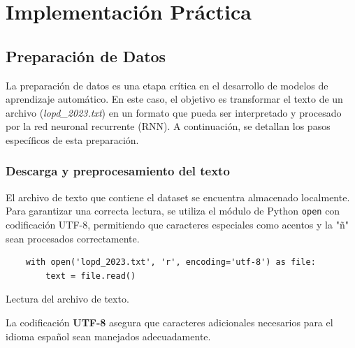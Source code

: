 \documentclass{article}
\begin{document}
\newpage

\section{Implementación Práctica}
\subsection{Preparación de Datos}
La preparación de datos es una etapa crítica en el desarrollo de modelos de aprendizaje automático. En este caso, el objetivo es transformar el texto de un archivo (\textit{lopd\_2023.txt}) en un formato que pueda ser interpretado y procesado por la red neuronal recurrente (RNN). A continuación, se detallan los pasos específicos de esta preparación.

\subsubsection{Descarga y preprocesamiento del texto}
El archivo de texto que contiene el dataset se encuentra almacenado localmente. Para garantizar una correcta lectura, se utiliza el módulo de Python \texttt{open} con codificación UTF-8, permitiendo que caracteres especiales como acentos y la "ñ" sean procesados correctamente.

\begin{listing}[H]
\begin{verbatim}
    with open('lopd_2023.txt', 'r', encoding='utf-8') as file:
        text = file.read()
\end{verbatim}
\caption{Lectura del archivo de texto.}
\end{listing}

\begin{tcolorbox}[colback=yellow!10!white, colframe=orange!80!black, title=Punto clave]
    La codificación \textbf{UTF-8} asegura que caracteres adicionales necesarios para el idioma español sean manejados adecuadamente.
\end{tcolorbox}
\end{document}

